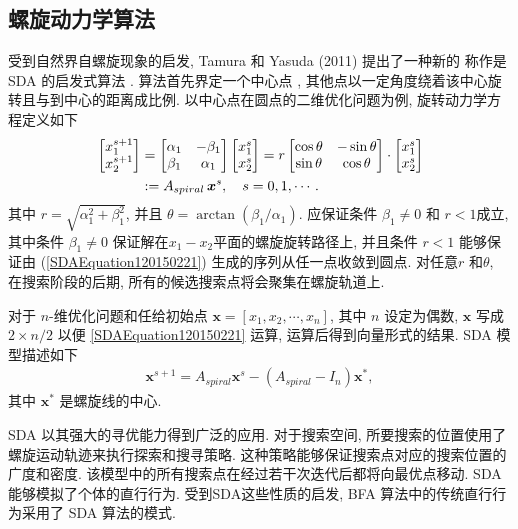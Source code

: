 \subsection{螺旋动力学算法}
受到自然界自螺旋现象的启发, Tamura 和 Yasuda (2011) 提出了一种新的 称作是 SDA 的启发式算法 . 算法首先界定一个中心点 , 其他点以一定角度绕着该中心旋转且与到中心的距离成比例. 以中心点在圆点的二维优化问题为例, 旋转动力学方程定义如下
\begin{align}\label{SDAEquation120150221}
  \begin{bmatrix}
    x_1^{s+1}\\
    x_2^{s+1}
  \end{bmatrix}
  &  =
    \begin{bmatrix}
    \alpha_1&  -\beta_1\\
    \beta_1& \alpha_1
  \end{bmatrix}
    \begin{bmatrix}
        x_1^{s}\\
        x_2^{s}
  \end{bmatrix}\notag
  = r\begin{bmatrix}
    \cos\theta &  -\sin\theta\\
    \sin\theta&  \cos\theta
  \end{bmatrix}\cdot
    \begin{bmatrix}
        x_1^{s}\\
        x_2^{s}
  \end{bmatrix}\\
  &:=A_{spiral}\,\bm x^s,\quad s=0,1,\cdots.
\end{align}
其中 $r=\sqrt{\alpha_1^2+\beta_1^2}$, 并且 $\theta=\arctan(\beta_1/\alpha_1)$. 应保证条件 $\beta_1\neq 0$ 和 $r < 1$成立, 其中条件 $\beta_1\neq 0$ 保证解在$x_1 - x_2$平面的螺旋旋转路径上, 并且条件 $r < 1$ 能够保证由 (\ref{SDAEquation120150221}) 生成的序列从任一点收敛到圆点. 对任意$r$ 和$\theta$, 在搜索阶段的后期, 所有的候选搜索点将会聚集在螺旋轨道上.

对于 $n$-维优化问题和任给初始点 $\bm x=[x_1 ,x_2,\cdots, x_n]$, 其中 $n$ 设定为偶数, $\bm x$ 写成 $ 2\times n/2$ 以便 \eqref{SDAEquation120150221} 运算, 运算后得到向量形式的结果. SDA 模型描述如下
\begin{align}
    \bm x^{s+1}=A_{spiral}\bm x^s-(A_{spiral}-I_n)\bm x^*,
\end{align}
其中 $\bm x^{*}$ 是螺旋线的中心.

SDA 以其强大的寻优能力得到广泛的应用. 对于搜索空间, 所要搜索的位置使用了螺旋运动轨迹来执行探索和搜寻策略. 这种策略能够保证搜索点对应的搜索位置的广度和密度. 该模型中的所有搜索点在经过若干次迭代后都将向最优点移动. SDA能够模拟了个体的直行行为. 受到SDA这些性质的启发, BFA 算法中的传统直行行为采用了 SDA 算法的模式.
